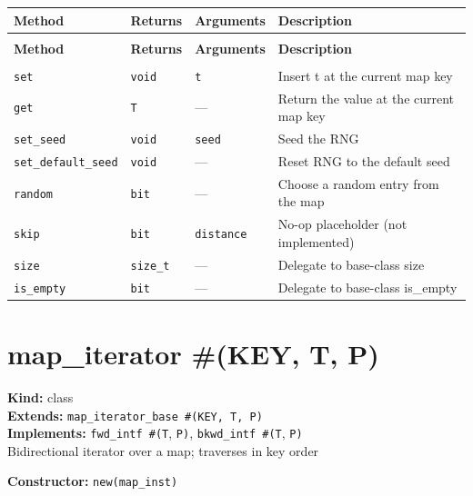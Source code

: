 \documentclass[11pt,letterpaper]{report}
\begin{document}
\begin{xltabular}{\linewidth}{>{\small}p{1.35in} >{\small}p{1.25in} >{\small}p{0.95in} >{\small}X}
\toprule
\textbf{Method} & \textbf{Returns} & \textbf{Arguments} & \textbf{Description} \\
\midrule
\endfirsthead
{} \\
\midrule
\textbf{Method} & \textbf{Returns} & \textbf{Arguments} & \textbf{Description} \\
\midrule
\endhead
\midrule
{} \\
\endfoot
\bottomrule
\endlastfoot
\texttt{set} & \texttt{void} & \texttt{t} & Insert t at the current map key \\
\texttt{get} & \texttt{T} & --- & Return the value at the current map key \\
\texttt{set\_seed} & \texttt{void} & \texttt{seed} & Seed the RNG \\
\texttt{set\_default\_seed} & \texttt{void} & --- & Reset RNG to the default seed \\
\texttt{random} & \texttt{bit} & --- & Choose a random entry from the map \\
\texttt{skip} & \texttt{bit} & \texttt{distance} & No-op placeholder (not implemented) \\
\texttt{size} & \texttt{size\_t} & --- & Delegate to base-class size \\
\texttt{is\_empty} & \texttt{bit} & --- & Delegate to base-class is\_empty \\
\end{xltabular}

\section{map\_iterator \#(KEY, T, P)}
\label{cls:mapiteratorKEYTP}

\noindent\textbf{Kind:} class\\
\noindent\textbf{Extends:} \texttt{map\_iterator\_base \#(KEY, T, P)}\\
\noindent\textbf{Implements:} \texttt{fwd\_intf \#(T}, \texttt{P)}, \texttt{bkwd\_intf \#(T}, \texttt{P)}\\
\noindent Bidirectional iterator over a map; traverses in key order

\noindent\textbf{Constructor:} \texttt{new(map\_inst)}
\end{document}
